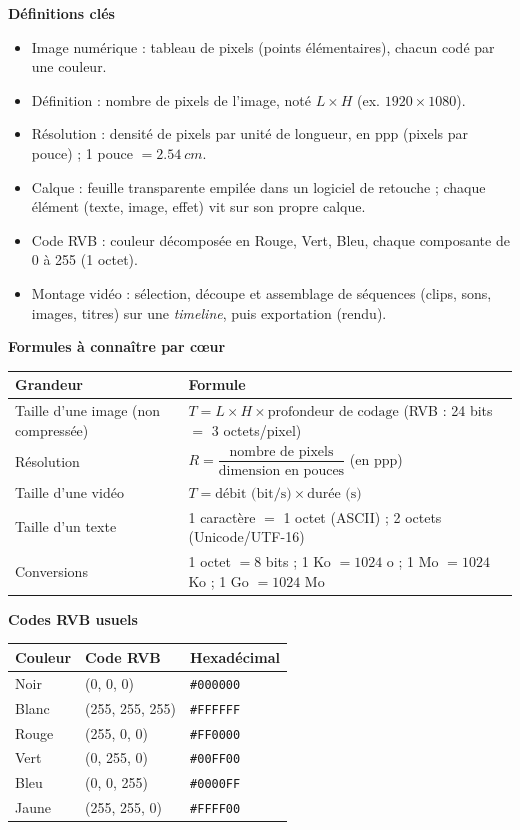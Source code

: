\documentclass[11pt]{article}
\newcommand{\cle}[1]{{\popxbold\color{popdark}#1}}
\begin{document}
\begin{bilan}
\textbf{Définitions clés}
\begin{itemize}
  \item \cle{Image numérique} : tableau de \cle{pixels} (points élémentaires), chacun codé par une couleur.
  \item \cle{Définition} : nombre de pixels de l'image, noté $L \times H$ (ex. $1920 \times 1080$).
  \item \cle{Résolution} : densité de pixels par unité de longueur, en \cle{ppp} (pixels par pouce) ; 1 pouce $= \SI{2,54}{cm}$.
  \item \cle{Calque} : feuille transparente empilée dans un logiciel de retouche ; chaque élément (texte, image, effet) vit sur son propre calque.
  \item \cle{Code RVB} : couleur décomposée en Rouge, Vert, Bleu, chaque composante de 0 à 255 (1 octet).
  \item \cle{Montage vidéo} : sélection, découpe et assemblage de séquences (clips, sons, images, titres) sur une \emph{timeline}, puis exportation (rendu).
\end{itemize}

\textbf{Formules à connaître par cœur}
\begin{center}
\begin{tabularx}{\linewidth}{|l|X|}
\hline
\rowcolor{popblueL} \textbf{Grandeur} & \textbf{Formule} \\
\hline
Taille d'une image (non compressée) & $T = L \times H \times \text{profondeur de codage}$ (RVB : 24 bits $=$ 3 octets/pixel) \\
\hline
Résolution & $R = \dfrac{\text{nombre de pixels}}{\text{dimension en pouces}}$ (en ppp) \\
\hline
Taille d'une vidéo & $T = \text{débit (bit/s)} \times \text{durée (s)}$ \\
\hline
Taille d'un texte & 1 caractère $=$ 1 octet (ASCII) ; 2 octets (Unicode/UTF-16) \\
\hline
Conversions & 1 octet $= 8$ bits ; 1 Ko $= 1024$ o ; 1 Mo $= 1024$ Ko ; 1 Go $= 1024$ Mo \\
\hline
\end{tabularx}
\end{center}

\textbf{Codes RVB usuels}
\begin{center}
\begin{tabularx}{\linewidth}{|l|X|l|}
\hline
\rowcolor{popblueL} \textbf{Couleur} & \textbf{Code RVB} & \textbf{Hexadécimal} \\
\hline
Noir & (0, 0, 0) & \texttt{\#000000} \\
Blanc & (255, 255, 255) & \texttt{\#FFFFFF} \\
Rouge & (255, 0, 0) & \texttt{\#FF0000} \\
Vert & (0, 255, 0) & \texttt{\#00FF00} \\
Bleu & (0, 0, 255) & \texttt{\#0000FF} \\
Jaune & (255, 255, 0) & \texttt{\#FFFF00} \\
\hline
\end{tabularx}
\end{center}


\end{bilan}
\end{document}
